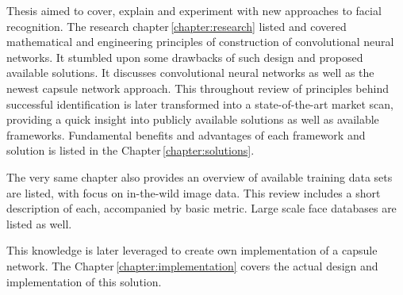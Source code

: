 Thesis aimed to cover, explain and experiment with new approaches to facial recognition. The research chapter\,\ref{chapter:research} listed and covered mathematical and engineering principles of construction of convolutional neural networks. It stumbled upon some drawbacks of such design and proposed available solutions. It discusses convolutional neural networks as well as the newest capsule network approach. This throughout review of principles behind successful identification is later transformed into a state-of-the-art market scan, providing a quick insight into publicly available solutions as well as available frameworks. Fundamental benefits and advantages of each framework and solution is listed in the Chapter\,\ref{chapter:solutions}.

The very same chapter also provides an overview of available training data sets are listed, with focus on in-the-wild image data. This review includes a short description of each, accompanied by basic metric. Large scale face databases are listed as well.

This knowledge is later leveraged to create own implementation of a capsule network. The Chapter\,\ref{chapter:implementation} covers the actual design and implementation of this solution.
